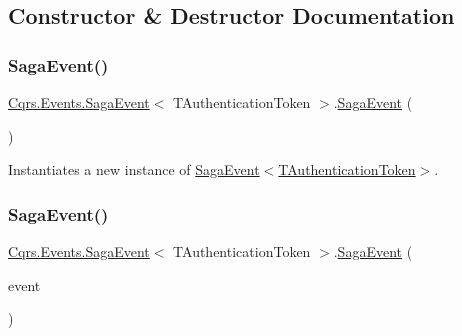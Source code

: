 \subsection{Constructor \& Destructor Documentation}
\mbox{\label{classCqrs_1_1Events_1_1SagaEvent_a658ce04baccb816bf132702cccaa6a90_a658ce04baccb816bf132702cccaa6a90}} 
\subsubsection{\texorpdfstring{Saga\+Event()}{SagaEvent()}\hspace{0.1cm}{\footnotesize\ttfamily [1/2]}}
{\footnotesize\ttfamily \hyperlink{classCqrs_1_1Events_1_1SagaEvent}{Cqrs.\+Events.\+Saga\+Event}$<$ T\+Authentication\+Token $>$.\hyperlink{classCqrs_1_1Events_1_1SagaEvent}{Saga\+Event} (\begin{DoxyParamCaption}{ }\end{DoxyParamCaption})}



Instantiates a new instance of \hyperlink{classCqrs_1_1Events_1_1SagaEvent_a658ce04baccb816bf132702cccaa6a90_a658ce04baccb816bf132702cccaa6a90}{Saga\+Event$<$\+T\+Authentication\+Token$>$}. 

\mbox{\label{classCqrs_1_1Events_1_1SagaEvent_aeb42f8e8f8e18bffe0dbe55b3da3c476_aeb42f8e8f8e18bffe0dbe55b3da3c476}} 
\subsubsection{\texorpdfstring{Saga\+Event()}{SagaEvent()}\hspace{0.1cm}{\footnotesize\ttfamily [2/2]}}
{\footnotesize\ttfamily \hyperlink{classCqrs_1_1Events_1_1SagaEvent}{Cqrs.\+Events.\+Saga\+Event}$<$ T\+Authentication\+Token $>$.\hyperlink{classCqrs_1_1Events_1_1SagaEvent}{Saga\+Event} (\begin{DoxyParamCaption}\item[{\hyperlink{interfaceCqrs_1_1Events_1_1IEvent}{I\+Event}$<$ T\+Authentication\+Token $>$ @}]{event }\end{DoxyParamCaption})}



